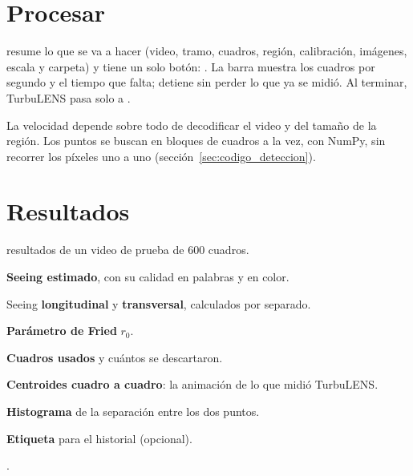 \section{Procesar}\label{sec:procesar}

 resume lo que se va a hacer (video, tramo, cuadros, región, calibración, imágenes, escala y carpeta) y
tiene un solo botón: . La barra muestra los cuadros por segundo y el tiempo que falta; 
detiene sin perder lo que ya se midió. Al terminar, TurbuLENS pasa solo a .


La velocidad depende sobre todo de decodificar el video y del tamaño de la región. Los puntos se buscan en bloques de cuadros a la vez, con NumPy, sin recorrer los
píxeles uno a uno (sección~\ref{sec:codigo_deteccion}).


\section{Resultados}\label{sec:resultados}

\begin{capturam}{resultados}{ de un video de prueba de 600 cuadros.}
\item \textbf{Seeing estimado}, con su calidad en palabras y en color.
\item Seeing \textbf{longitudinal} y \textbf{transversal}, calculados por separado.
\item \textbf{Parámetro de Fried} $r_0$.
\item \textbf{Cuadros usados} y cuántos se descartaron.
\item \textbf{Centroides cuadro a cuadro}: la animación de lo que midió TurbuLENS.
\item \textbf{Histograma} de la separación entre los dos puntos.
\item \textbf{Etiqueta} para el historial (opcional).
\item {}.
\end{capturam}

